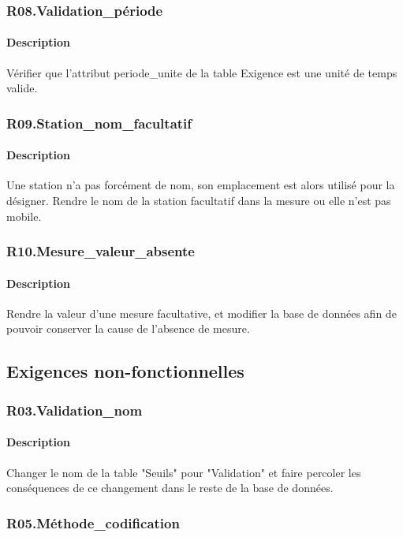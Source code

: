 \documentclass{article}
\begin{document}
\subsubsection{R08.Validation\_période}
\paragraph{Description} Vérifier que l'attribut periode\_unite de la table Exigence
est une unité de temps valide.


\subsubsection{R09.Station\_nom\_facultatif}
\paragraph{Description} Une station n'a pas forcément de nom, son emplacement
est alors utilisé pour la désigner. Rendre le nom de la station facultatif 
dans la mesure ou elle n'est pas mobile.


\subsubsection{R10.Mesure\_valeur\_absente}
\paragraph{Description} Rendre la valeur d'une mesure facultative, et modifier la base de données
afin de pouvoir conserver la cause de l'absence de mesure.


\subsection{Exigences non-fonctionnelles}
\subsubsection{R03.Validation\_nom}
\paragraph{Description} Changer le nom de la table "Seuils" pour "Validation"
et faire percoler les conséquences de ce changement dans le reste de la base de données.


\subsubsection{R05.Méthode\_codification}
\end{document}
